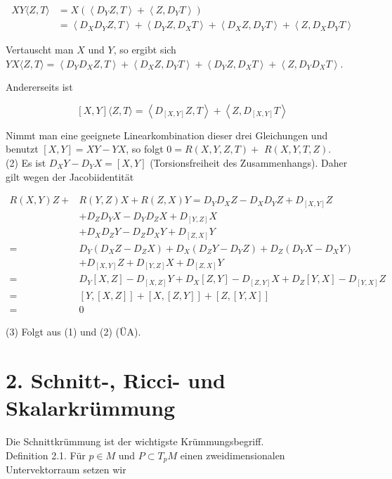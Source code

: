 \documentclass[10pt, letterpaper]{article}
\begin{document}
$$
\begin{aligned}
X Y\langle Z, T\rangle & =X\left(\left\langle D_{Y} Z, T\right\rangle+\left\langle Z, D_{Y} T\right\rangle\right) \\
& =\left\langle D_{X} D_{Y} Z, T\right\rangle+\left\langle D_{Y} Z, D_{X} T\right\rangle+\left\langle D_{X} Z, D_{Y} T\right\rangle+\left\langle Z, D_{X} D_{Y} T\right\rangle
\end{aligned}
$$

Vertauscht man $X$ und $Y$, so ergibt sich\\
$Y X\langle Z, T\rangle=\left\langle D_{Y} D_{X} Z, T\right\rangle+\left\langle D_{X} Z, D_{Y} T\right\rangle+\left\langle D_{Y} Z, D_{X} T\right\rangle+\left\langle Z, D_{Y} D_{X} T\right\rangle$.

Andererseits ist

$$
[X, Y]\langle Z, T\rangle=\left\langle D_{[X, Y]} Z, T\right\rangle+\left\langle Z, D_{[X, Y]} T\right\rangle
$$

Nimmt man eine geeignete Linearkombination dieser drei Gleichungen und benutzt $[X, Y]=X Y-Y X$, so folgt $0=R(X, Y, Z, T)+$ $R(X, Y, T, Z)$.\\
(2) Es ist $D_{X} Y-D_{Y} X=[X, Y]$ (Torsionsfreiheit des Zusammenhangs). Daher gilt wegen der Jacobiidentität

$$
\begin{aligned}
R(X, Y) Z+ & R(Y, Z) X+R(Z, X) Y=D_{Y} D_{X} Z-D_{X} D_{Y} Z+D_{[X, Y]} Z \\
& +D_{Z} D_{Y} X-D_{Y} D_{Z} X+D_{[Y, Z]} X \\
& +D_{X} D_{Z} Y-D_{Z} D_{X} Y+D_{[Z, X]} Y \\
= & D_{Y}\left(D_{X} Z-D_{Z} X\right)+D_{X}\left(D_{Z} Y-D_{Y} Z\right)+D_{Z}\left(D_{Y} X-D_{X} Y\right) \\
& +D_{[X, Y]} Z+D_{[Y, Z]} X+D_{[Z, X]} Y \\
= & D_{Y}[X, Z]-D_{[X, Z]} Y+D_{X}[Z, Y]-D_{[Z, Y]} X+D_{Z}[Y, X]-D_{[Y, X]} Z \\
= & {[Y,[X, Z]]+[X,[Z, Y]]+[Z,[Y, X]] } \\
= & 0
\end{aligned}
$$

(3) Folgt aus (1) und (2) (ÜA).

\section*{2. Schnitt-, Ricci- und Skalarkrümmung}
Die Schnittkrümmung ist der wichtigste Krümmungsbegriff.\\
Definition 2.1. Für $p \in M$ und $P \subset T_{p} M$ einen zweidimensionalen Untervektorraum setzen wir
\end{document}
